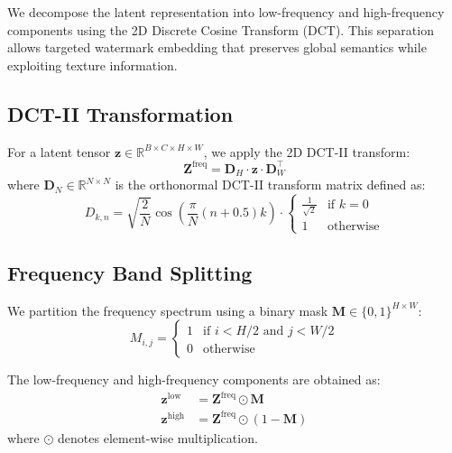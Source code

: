 \documentclass[11pt]{article}
\begin{document}
We decompose the latent representation into low-frequency and high-frequency components using the 2D Discrete Cosine Transform (DCT). This separation allows targeted watermark embedding that preserves global semantics while exploiting texture information.

\subsection{DCT-II Transformation}

For a latent tensor $\mathbf{z} \in \mathbb{R}^{B \times C \times H \times W}$, we apply the 2D DCT-II transform:
\begin{equation}
    \mathbf{Z}^{\text{freq}} = \mathbf{D}_H \cdot \mathbf{z} \cdot \mathbf{D}_W^{\top}
\end{equation}
where $\mathbf{D}_N \in \mathbb{R}^{N \times N}$ is the orthonormal DCT-II transform matrix defined as:
\begin{equation}
    D_{k,n} = \sqrt{\frac{2}{N}} \cos\left(\frac{\pi}{N}(n + 0.5)k\right) \cdot 
    \begin{cases} 
        \frac{1}{\sqrt{2}} & \text{if } k = 0 \\ 
        1 & \text{otherwise} 
    \end{cases}
\end{equation}

\subsection{Frequency Band Splitting}

We partition the frequency spectrum using a binary mask $\mathbf{M} \in \{0, 1\}^{H \times W}$:
\begin{equation}
    M_{i,j} = 
    \begin{cases} 
        1 & \text{if } i < H/2 \text{ and } j < W/2 \\ 
        0 & \text{otherwise} 
    \end{cases}
\end{equation}

The low-frequency and high-frequency components are obtained as:
\begin{align}
    \mathbf{z}^{\text{low}} &= \mathbf{Z}^{\text{freq}} \odot \mathbf{M} \\
    \mathbf{z}^{\text{high}} &= \mathbf{Z}^{\text{freq}} \odot (1 - \mathbf{M})
\end{align}
where $\odot$ denotes element-wise multiplication.
\end{document}
